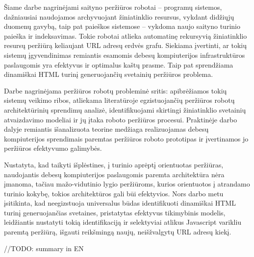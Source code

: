 


Šiame darbe nagrinėjami saityno peržiūros robotai -- programų sistemos, dažniausiai naudojamos archyvuojant žiniatinklio resursus, vykdant didžiųjų duomenų gavybą, taip pat paieškos sistemose -- vykdoma naujo saityno turinio paieška ir indeksavimas. Tokie robotai atlieka automatinę rekursyvią žiniatinklio resursų peržiūrą keliaujant URL adresų erdvės grafu. Siekiama įvertinti, ar tokių sistemų įgyvendinimas remiantis esamomis debesų kompiuterijos infrastruktūros paslaugomis yra efektyvus ir optimalus kaštų prasme. Taip pat sprendžiama dinamiškai HTML turinį generuojančių svetainių peržiūros problema. 

Darbe nagrinėjama peržiūros robotų probleminė sritis: apibrėžiamos tokių sistemų veikimo ribos, atliekama literatūroje egzistuojančių peržiūros robotų architektūrinių sprendimų analizė, identifikuojami skirtingi žiniatinklio svetainių atvaizdavimo modeliai ir jų įtaka roboto peržiūros procesui. Praktinėje darbo dalyje remiantis išanalizuota teorine medžiaga realizuojamas debesų kompiuterijos sprendimais paremtas peržiūros roboto prototipas ir įvertinamos jo peržiūros efektyvumo galimybės.

Nustatyta, kad taikyti išplėstines, į turinio aprėptį orientuotas peržiūras, naudojantis debesų kompiuterijos paslaugomis paremta architektūra nėra įmanoma, tačiau mažo-vidutinio lygio peržiūroms, kurios orientuotos į atrandamo turinio kokybę, tokios architektūros gali būi efektyvios. Nors darbo metu įsitikinta, kad neegizstuoja universalus būdas identifikuoti dinamiškai HTML turinį generuojančias svetaines, pristatytas efektyvus tikimybinis modelis, leidžiantis nustatyti tokią identifikaciją ir selektyviai atlikus Javascript varikliu paremtą peržiūrą, išgauti reikšmingą naujų, neišžvalgytų URL adresų kiekį.  



//TODO: summary in EN

